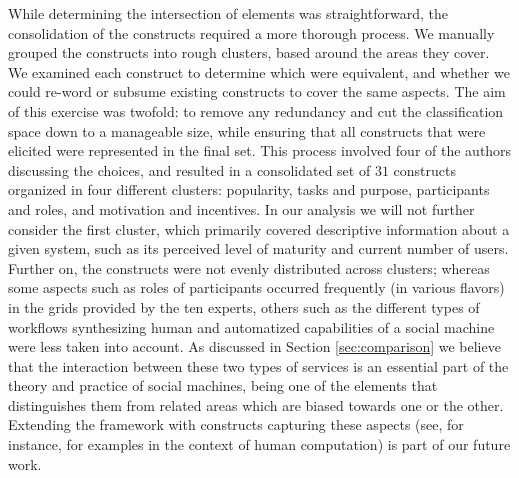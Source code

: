 \documentclass{sig-alternate}
\begin{document}

While determining the intersection of elements was straightforward, the consolidation of the
constructs required a more thorough process. We manually grouped the constructs into rough clusters, based around the areas they cover. We examined each construct to determine which were equivalent, and whether we could re-word or subsume existing constructs to cover the same aspects. The aim of this exercise was twofold: to remove any redundancy and cut the classification space down to a manageable size, while ensuring that all constructs that were elicited were represented in the final set. This process involved four of the authors discussing the choices, and resulted in a consolidated set of $31$ constructs organized in four different clusters: popularity, tasks and purpose, participants and roles, and motivation and incentives. In our analysis we will not further consider the first cluster, which primarily covered descriptive information about a given system, such as its perceived level of maturity and current number of users. Further on, the constructs were not evenly distributed across clusters; whereas some aspects such as roles of participants occurred frequently (in various flavors) in the grids provided by the ten experts, others such as the different types of workflows synthesizing human and automatized capabilities of a social machine were less taken into account. As discussed in Section \ref{sec:comparison} we believe that the interaction between these two types of services is an essential part of the theory and practice of social machines, being one of the elements that distinguishes them from related areas which are biased towards one or the other. Extending the framework with constructs capturing these aspects (see, for instance, \cite{quinn2011human} for examples in the context of human computation) is part of our future work.
\end{document}
